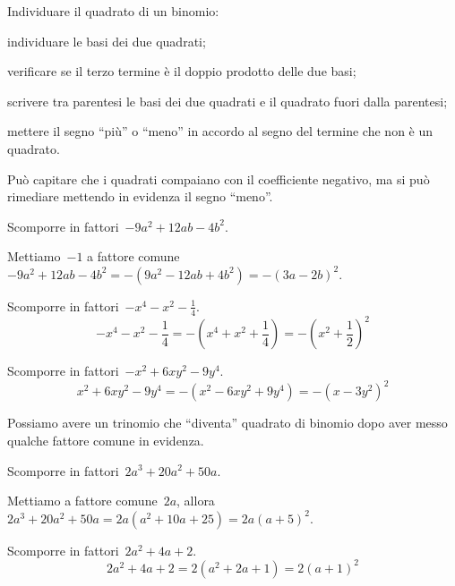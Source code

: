 \begin{procedura}
Individuare il quadrato di un binomio:
\begin{enumeratea}
\item individuare le basi dei due quadrati;
\item verificare se il terzo termine è il doppio prodotto delle due basi;
\item scrivere tra parentesi le basi dei due quadrati e il quadrato fuori 
 dalla parentesi;
\item mettere il segno ``più'' o ``meno'' in accordo al segno del termine che 
 non è un quadrato.
\end{enumeratea}
\end{procedura}

Può capitare che i quadrati compaiano con il coefficiente negativo, ma si può 
rimediare mettendo in evidenza il segno ``meno''.

 \begin{esempio}
Scomporre in fattori~$-9a^{2}+12{ab}-4b^{2}$.

Mettiamo~$-1$ a fattore 
comune~$-9a^{2}+12ab-4b^{2}=-(9a^{2}-12{ab}+4b^{2})=-(3a-2b)^{2}$.
 \end{esempio}

 \begin{esempio}
Scomporre in fattori~$-x^{4}-x^{2}-\frac{1}{4}$.
\[-x^{4}-x^{2}-\frac{1}{4}=-\left(x^{4}+x^{2}+\frac{1}{4}\right)=
  -\left(x^{2}+\frac{1}{2}\right)^{2}\]
 \end{esempio}

 \begin{esempio}
Scomporre in fattori~$-x^{2}+6xy^{2}-9y^{4}$.
\[x^{2}+6xy^{2}-9y^{4}=-\left(x^{2}-6xy^{2}+9y^{4}\right)=
  -\left(x-3y^{2}\right)^{2}\]
 \end{esempio}

Possiamo avere un trinomio che ``diventa'' quadrato di binomio dopo aver messo 
qualche fattore comune in evidenza.

 \begin{esempio}
Scomporre in fattori~$2a^{3}+20a^{2}+50a$.

Mettiamo a fattore comune~$2a$, 
allora~$2a^{3}+20a^{2}+50a=2a(a^{2}+10a+25)=2a(a+5)^{2}$.
 \end{esempio}

 \begin{esempio}
Scomporre in fattori~$2a^{2}+4a+2$.
\[2a^{2}+4a+2=2\left(a^{2}+2a+1\right)=2(a+1)^{2}\]
 \end{esempio}

